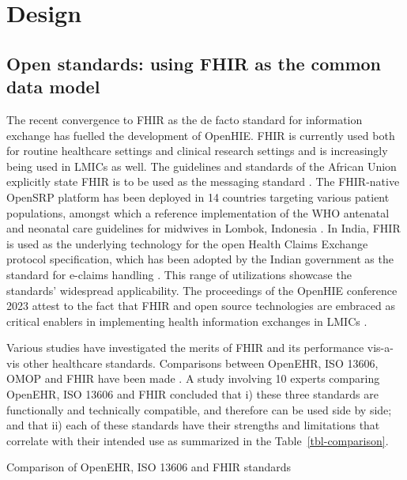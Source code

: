 \documentclass[
  authoryear]{elsarticle}
\begin{document}
\section{Design}\label{design}

\subsection{Open standards: using FHIR as the common data
model}\label{open-standards-using-fhir-as-the-common-data-model}

The recent convergence to FHIR as the de facto standard for information
exchange has fuelled the development of OpenHIE. FHIR is currently used
both for routine healthcare settings
\citep{amar2024electronic, ayaz2021fast} and clinical research settings
\citep{duda2022hl7, vorisek2022fast} and is increasingly being used in
LMICs as well. The guidelines and standards of the African Union
explicitly state FHIR is to be used as the messaging standard
\citep{2023african}. The FHIR-native OpenSRP platform
\citep{mehl2020open} has been deployed in 14 countries targeting various
patient populations, amongst which a reference implementation of the WHO
antenatal and neonatal care guidelines for midwives in Lombok, Indonesia
\citep{summitinstitutefordevelopment2023bunda, kurniawan2019midwife}. In
India, FHIR is used as the underlying technology for the open Health
Claims Exchange protocol specification, which has been adopted by the
Indian government as the standard for e-claims handling \citep{hcx}.
This range of utilizations showcase the standards' widespread
applicability. The proceedings of the OpenHIE conference 2023 attest to
the fact that FHIR and open source technologies are embraced as critical
enablers in implementing health information exchanges in LMICs
\citep{ohie2023unconference}.

Various studies have investigated the merits of FHIR and its performance
vis-a-vis other healthcare standards. Comparisons between OpenEHR, ISO
13606, OMOP and FHIR have been made
\citep{ayaz2023transforming, mullie2023coda, rinaldi2021openehr, cremonesi2023need, sinaci2023data, tsafnat2024converge}.
A study involving 10 experts comparing OpenEHR, ISO 13606 and FHIR
concluded that i) these three standards are functionally and technically
compatible, and therefore can be used side by side; and that ii) each of
these standards have their strengths and limitations that correlate with
their intended use as summarized in the Table~\ref{tbl-comparison}.

\begin{table}

\caption{\label{tbl-comparison}Comparison of OpenEHR, ISO 13606 and FHIR
standards}


\end{table}%
\end{document}
